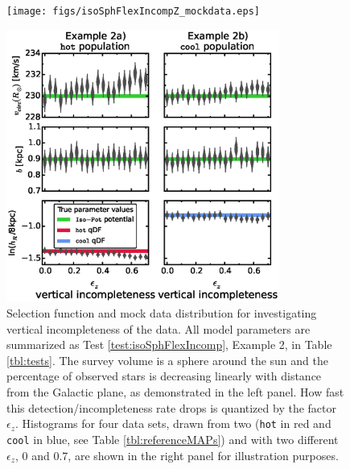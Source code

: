\begin{figure}
\centering
\begin{minipage}{.45\textwidth}
  \centering
\texttt{[image: figs/isoSphFlexIncompZ\_mockdata.eps]}
\caption{Selection function and mock data distribution for investigating vertical incompleteness of the data. All model parameters are summarized as Test \ref{test:isoSphFlexIncomp}, Example 2, in Table \ref{tbl:tests}. The survey volume is a sphere around the sun and the percentage of observed stars is decreasing linearly with distance from the Galactic plane, as demonstrated in the left panel. How fast this detection/incompleteness rate drops is quantized by the factor $\epsilon_z$. Histograms for four data sets, drawn from two \MAPs{} (\texttt{hot} in red and \texttt{cool} in blue, see Table \ref{tbl:referenceMAPs}) and with two different $\epsilon_z$, 0 and 0.7, are shown in the right panel for illustration purposes. } 
\label{fig:isoSphFlexIncompZ_mockdata}
\end{minipage}%
\hspace{0.09\textwidth}
\begin{minipage}{.45\textwidth}
  \centering
\includegraphics[width=0.8\textwidth]{figs/isoSphFlexIncompZ_violins_2.eps}

\end{minipage}
\end{figure}

